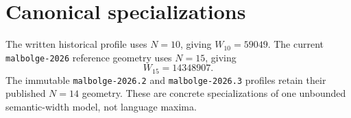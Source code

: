 \documentclass{article}
\begin{document}
\section{Canonical specializations}

The written historical profile uses $N=10$, giving $W_{10}=59049$. The current
\texttt{malbolge-2026} reference geometry uses $N=15$, giving
\begin{equation}
  W_{15}=14348907.
  \label{eq:profile-current-width}
\end{equation}
The immutable \texttt{malbolge-2026.2} and \texttt{malbolge-2026.3}
profiles retain their published $N=14$ geometry. These are concrete
specializations of one unbounded semantic-width model, not language maxima.
\end{document}
